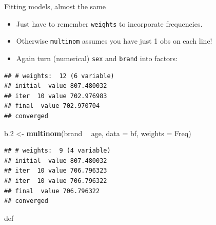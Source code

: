 \documentclass[ignorenonframetext,]{beamer}
\newenvironment{Shaded}{\begin{snugshade}}{\end{snugshade}}
\newcommand{\DataTypeTok}[1]{\textcolor[rgb]{0.13,0.29,0.53}{#1}}
\newcommand{\FloatTok}[1]{\textcolor[rgb]{0.00,0.00,0.81}{#1}}
\newcommand{\KeywordTok}[1]{\textcolor[rgb]{0.13,0.29,0.53}{\textbf{#1}}}
\newcommand{\NormalTok}[1]{#1}
\newcommand{\OperatorTok}[1]{\textcolor[rgb]{0.81,0.36,0.00}{\textbf{#1}}}
\newcommand{\StringTok}[1]{\textcolor[rgb]{0.31,0.60,0.02}{#1}}
\begin{document}
\begin{frame}[fragile]{Fitting models, almost the same}
\protect\hypertarget{fitting-models-almost-the-same}{}

\begin{itemize}
\item
  Just have to remember \texttt{weights} to incorporate frequencies.
\item
  Otherwise \texttt{multinom} assumes you have just 1 obs on each line!
\item
  Again turn (numerical) \texttt{sex} and \texttt{brand} into factors:
\end{itemize}

\begin{Shaded}
\end{Shaded}

\begin{verbatim}
## # weights:  12 (6 variable)
## initial  value 807.480032 
## iter  10 value 702.976983
## final  value 702.970704 
## converged
\end{verbatim}

\begin{Shaded}
\begin{Highlighting}[]
\NormalTok{b}\FloatTok{.2}\NormalTok{ <-}\StringTok{ }\KeywordTok{multinom}\NormalTok{(brand }\OperatorTok{~}\StringTok{ }\NormalTok{age, }\DataTypeTok{data =}\NormalTok{ bf, }\DataTypeTok{weights =}\NormalTok{ Freq)}
\end{Highlighting}
\end{Shaded}

\begin{verbatim}
## # weights:  9 (4 variable)
## initial  value 807.480032 
## iter  10 value 706.796323
## iter  10 value 706.796322
## final  value 706.796322 
## converged
\end{verbatim}

def

\end{frame}
\end{document}
